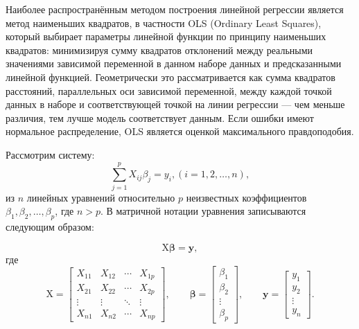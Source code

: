 Наиболее распространённым методом построения линейной регрессии является метод наименьших квадратов, в частности OLS (Ordinary Least Squares), который выбирает параметры линейной функции по принципу наименьших квадратов: минимизируя сумму квадратов отклонений между реальными значениями зависимой переменной в данном наборе данных и предсказанными линейной функцией. Геометрически это рассматривается как сумма квадратов расстояний, параллельных оси зависимой переменной, между каждой точкой данных в наборе и соответствующей точкой на линии регрессии --- чем меньше различия, тем лучше модель соответствует данным. Если ошибки имеют нормальное распределение, OLS является оценкой максимального правдоподобия.

Рассмотрим систему:
\begin{equation}
\label{eq:ols}
\sum_{j = 1}^{p} X_{ij} \beta_{j} = y_{i}, \left(i = 1,2, \dots, n\right),
\end{equation}
из $n$ линейных уравнений относительно $p$ неизвестных коэффициентов $\beta_{1}, \beta_{2}, \dots, \beta_{p}$, где $n>p$. В матричной нотации уравнения записываются следующим образом:

\begin{equation}
\label{eq:ols_matrix}
\mathrm{X}{\boldsymbol{\beta}} = \mathbf {y},
\end{equation}
где
\begin{equation}
\label{eq:matrix_ols_vectors}
\mathrm{X} = {\begin{bmatrix}X_{11} & X_{12} & \cdots & X_{1p} \\ X_{21} & X_{22} & \cdots & X_{2p} \\\vdots & \vdots & \ddots & \vdots \\ X_{n1} & X_{n2} & \cdots & X_{np} \end{bmatrix}}, \qquad {\boldsymbol{\beta}} = {\begin{bmatrix} \beta_{1} \\\beta_{2} \\\vdots \\\beta_{p} \end{bmatrix}}, \qquad \mathbf{y} = {\begin{bmatrix}y_{1} \\ y_{2} \\\vdots \\ y_{n} \end{bmatrix}}.
\end{equation}

